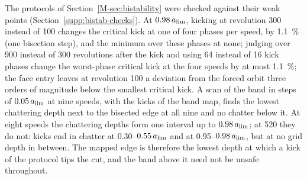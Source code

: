 The protocols of Section~\ref{M-sec:bistability} were checked against their weak points (Section~\ref{supp:bistab-checks}). At $0.98\,a_{\lim}$, kicking at revolution 300 instead of 100 changes the critical kick at one of four phases per speed, by \SI{1.1}{\percent} (one bisection step), and the minimum over these phases at none; judging over 900 instead of 300 revolutions after the kick and using 64 instead of 16 kick phases change the worst-phase critical kick at the four speeds by at most \SI{1.1}{\percent}; the face entry leaves at revolution 100 a deviation from the forced orbit three orders of magnitude below the smallest critical kick. A scan of the band in steps of $0.05\,a_{\lim}$ at nine speeds, with the kicks of the band map, finds the lowest chattering depth next to the bisected edge at all nine and no chatter below it. At eight speeds the chattering depths form one interval up to $0.98\,a_{\lim}$; at \SI{520}{\rpm} they do not: kicks end in chatter at 0.30--$0.55\,a_{\lim}$ and at 0.95--$0.98\,a_{\lim}$, but at no grid depth in between. The mapped edge is therefore the lowest depth at which a kick of the protocol tips the cut, and the band above it need not be unsafe throughout.
